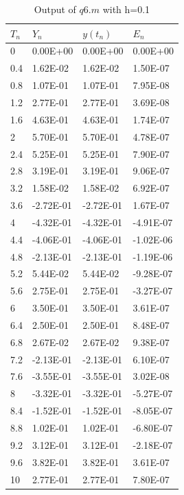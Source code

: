 \documentclass[10pt,a4paper]{report}
\begin{document}
\begin{table}[H]%
\centering
\begin{tabular}{|l|l|l|l|}
\hline
$T_n$ & $Y_n$      & $y(t_n)$   & $E_n$      \\ \hline
0    & 0.00E+00  & 0.00E+00  & 0.00E+00  \\ \hline
0.4  & 1.62E-02  & 1.62E-02  & 1.50E-07  \\ \hline
0.8  & 1.07E-01  & 1.07E-01  & 7.95E-08  \\ \hline
1.2  & 2.77E-01  & 2.77E-01  & 3.69E-08  \\ \hline
1.6  & 4.63E-01  & 4.63E-01  & 1.74E-07  \\ \hline
2    & 5.70E-01  & 5.70E-01  & 4.78E-07  \\ \hline
2.4  & 5.25E-01  & 5.25E-01  & 7.90E-07  \\ \hline
2.8  & 3.19E-01  & 3.19E-01  & 9.06E-07  \\ \hline
3.2  & 1.58E-02  & 1.58E-02  & 6.92E-07  \\ \hline
3.6  & -2.72E-01 & -2.72E-01 & 1.67E-07  \\ \hline
4    & -4.32E-01 & -4.32E-01 & -4.91E-07 \\ \hline
4.4  & -4.06E-01 & -4.06E-01 & -1.02E-06 \\ \hline
4.8  & -2.13E-01 & -2.13E-01 & -1.19E-06 \\ \hline
5.2  & 5.44E-02  & 5.44E-02  & -9.28E-07 \\ \hline
5.6  & 2.75E-01  & 2.75E-01  & -3.27E-07 \\ \hline
6    & 3.50E-01  & 3.50E-01  & 3.61E-07  \\ \hline
6.4  & 2.50E-01  & 2.50E-01  & 8.48E-07  \\ \hline
6.8  & 2.67E-02  & 2.67E-02  & 9.38E-07  \\ \hline
7.2  & -2.13E-01 & -2.13E-01 & 6.10E-07  \\ \hline
7.6  & -3.55E-01 & -3.55E-01 & 3.02E-08  \\ \hline
8    & -3.32E-01 & -3.32E-01 & -5.27E-07 \\ \hline
8.4  & -1.52E-01 & -1.52E-01 & -8.05E-07 \\ \hline
8.8  & 1.02E-01  & 1.02E-01  & -6.80E-07 \\ \hline
9.2  & 3.12E-01  & 3.12E-01  & -2.18E-07 \\ \hline
9.6  & 3.82E-01  & 3.82E-01  & 3.61E-07  \\ \hline
10   & 2.77E-01  & 2.77E-01  & 7.80E-07  \\ \hline
\end{tabular}
\caption{Output of $q6.m$ with h=0.1}
\end{table}
\end{document}
